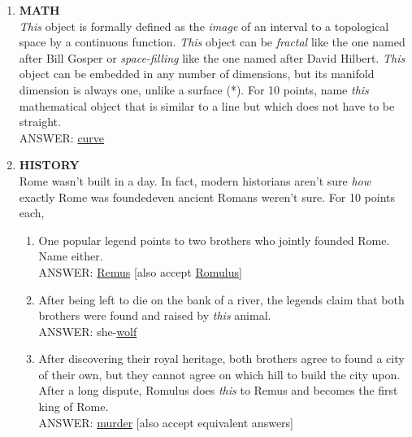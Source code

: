 \documentclass{report}
\newcommand*{\backtrack}{\setcounter{enumi}{\numexpr\theenumi-1\relax}}
\begin{document}
\begin{enumerate}
    \item \textbf{MATH} \\ \textit{This} object is formally defined as the \textit{image} of an interval to a topological space by a continuous function. \textit{This} object can be  \textit{fractal} like the one named after Bill Gosper or \textit{space-filling} like the one named after David Hilbert. \textit{This} object can be embedded in any number of dimensions, but its manifold dimension is always one, unlike a surface (*). For 10 points, name \textit{this} mathematical object that is similar to a line but which does not have to be straight. \\ ANSWER: \underline{curve} \backtrack
    \item \textbf{HISTORY} \\ Rome wasn't built in a day. In fact, modern historians aren't sure \textit{how} exactly Rome was founded\textemdash even ancient Romans weren't sure. For 10 points each,
    \begin{enumerate}[label=\Alph*]
        \item One popular legend points to two brothers who jointly founded Rome. Name either. \\ ANSWER: \underline{Remus} [also accept \underline{Romulus}]
        \item After being left to die on the bank of a river, the legends claim that both brothers were found and raised by \textit{this} animal. \\ ANSWER: she-\underline{wolf}
        \item After discovering their royal heritage, both brothers agree to found a city of their own, but they cannot agree on which hill to build the city upon. After a long dispute, Romulus does \textit{this} to Remus and becomes the first king of Rome. \\ ANSWER: \underline{murder} [also accept equivalent answers]
    \end{enumerate}
    \newpage
    

\end{enumerate}
\end{document}
